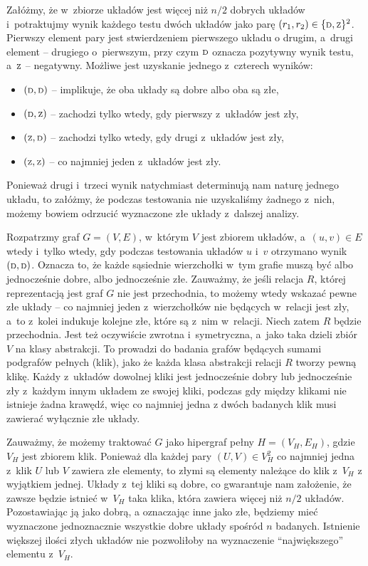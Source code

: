 \subproblem %
Załóżmy, że w~zbiorze układów jest więcej niż $n/2$ dobrych układów i~potraktujmy wynik każdego testu dwóch układów jako parę $(r_1,r_2)\in\{{\scriptstyle\rm D},{\scriptstyle\rm Z}\}^2$. Pierwszy element pary jest stwierdzeniem pierwszego układu o drugim, a~drugi element -- drugiego o~pierwszym, przy czym ${\scriptstyle\rm D}$ oznacza pozytywny wynik testu, a~${\scriptstyle\rm Z}$ -- negatywny. Możliwe jest uzyskanie jednego z~czterech wyników:
\begin{itemize}
	\item $({\scriptstyle\rm D},{\scriptstyle\rm D})$ -- implikuje, że oba układy są dobre albo oba są złe,
	\item $({\scriptstyle\rm D},{\scriptstyle\rm Z})$ -- zachodzi tylko wtedy, gdy pierwszy z~układów jest zły,
	\item $({\scriptstyle\rm Z},{\scriptstyle\rm D})$ -- zachodzi tylko wtedy, gdy drugi z~układów jest zły,
	\item $({\scriptstyle\rm Z},{\scriptstyle\rm Z})$ -- co najmniej jeden z~układów jest zły.
\end{itemize}
Ponieważ drugi i~trzeci wynik natychmiast determinują nam naturę jednego układu, to załóżmy, że podczas testowania nie uzyskaliśmy żadnego z~nich, możemy bowiem odrzucić wyznaczone złe układy z~dalszej analizy.

Rozpatrzmy graf $G=(V,E)$, w~którym $V$ jest zbiorem układów, a~$(u,v)\in E$ wtedy i~tylko wtedy, gdy podczas testowania układów $u$ i~$v$ otrzymano wynik $({\scriptstyle\rm D},{\scriptstyle\rm D})$. Oznacza to, że każde sąsiednie wierzchołki w~tym grafie muszą być albo jednocześnie dobre, albo jednocześnie złe. Zauważmy, że jeśli relacja $R$, której reprezentacją jest graf $G$ nie jest przechodnia, to możemy wtedy wskazać pewne złe układy -- co najmniej jeden z~wierzchołków nie będących w~relacji jest zły, a~to z~kolei indukuje kolejne złe, które są z~nim w~relacji. Niech zatem $R$ będzie przechodnia. Jest też oczywiście zwrotna i~symetryczna, a~jako taka dzieli zbiór $V$ na klasy abstrakcji. To prowadzi do badania grafów będących sumami podgrafów pełnych (klik), jako że każda klasa abstrakcji relacji $R$ tworzy pewną klikę. Każdy z~układów dowolnej kliki jest jednocześnie dobry lub jednocześnie zły z~każdym innym układem ze swojej kliki, podczas gdy między klikami nie istnieje żadna krawędź, więc co najmniej jedna z dwóch badanych klik musi zawierać wyłącznie złe układy.

Zauważmy, że możemy traktować $G$ jako hipergraf pełny $H=(V_H,E_H)$, gdzie $V_H$ jest zbiorem klik. Ponieważ dla każdej pary $(U,V)\in V_H^2$ co najmniej jedna z~klik $U$ lub $V$ zawiera złe elementy, to złymi są elementy należące do klik z~$V_H$ z wyjątkiem jednej. Układy z~tej kliki są dobre, co gwarantuje nam założenie, że zawsze będzie istnieć w~$V_H$ taka klika, która zawiera więcej niż $n/2$ układów. Pozostawiając ją jako dobrą, a oznaczając inne jako złe, będziemy mieć wyznaczone jednoznacznie wszystkie dobre układy spośród $n$ badanych. Istnienie większej ilości złych układów nie pozwoliłoby na wyznaczenie ``największego'' elementu z~$V_H$.

